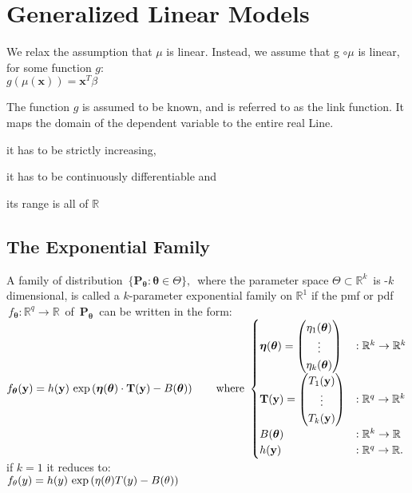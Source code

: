 
\section{Generalized Linear Models}
We relax the assumption that $\mu$ is linear. Instead, we assume that g $\circ \mu$ is linear, for some function $g$:\\

$g(\mu (\mathbf x)) = \mathbf x^ T \beta$

The function $g$ is assumed to be known, and is referred to as the link function. It maps the domain of the dependent variable to the entire real Line.

it has to be strictly increasing,

it has to be continuously differentiable and

its range is all of $\mathbb{R}$


\subsection{The Exponential Family}

A family of distribution $\, \{ \mathbf{P}_{{\boldsymbol \theta }}: {\boldsymbol \theta }\in \Theta \} ,\,$  where the parameter space $\Theta \subset \mathbb {R}^ k\,$ is -$k$ dimensional, is called a $k$-parameter exponential family on $\mathbb{R}^1$ if the pmf or pdf $\, f_{\boldsymbol \theta }:\mathbb {R}^ q\to \mathbb {R}\,$ of $\, \mathbf{P}_{{\boldsymbol \theta }}\,$ can be written in the form:\\

$\displaystyle  \displaystyle f_{\boldsymbol \theta }(\mathbf{y})=h(\mathbf{y})\, \exp \left({\boldsymbol \eta }({\boldsymbol \theta })\cdot \mathbf{T}(\mathbf{y})-B({\boldsymbol \theta })\right)\qquad \text {where } \\ \begin{cases}  {\boldsymbol \eta }({\boldsymbol \theta })=\begin{pmatrix} \eta _1({\boldsymbol \theta })\\ \vdots \\ \eta _ k({\boldsymbol \theta })\end{pmatrix}& :\mathbb {R}^ k\to \mathbb {R}^ k\\ \mathbf{T}(\mathbf{y})=\begin{pmatrix} T_1(\mathbf{y})\\ \vdots \\ T_ k(\mathbf{y})\end{pmatrix}& :\mathbb {R}^ q\to \mathbb {R}^ k\\ B({\boldsymbol \theta })& :\mathbb {R}^ k\to \mathbb {R}\\ h(\mathbf{y})& :\mathbb {R}^ q\to \mathbb {R}.\\ \end{cases}$\\


if $k=1$ it reduces to:\\

$\displaystyle  \displaystyle f_\theta (y)=h(y)\, \exp \left(\eta (\theta ) T(y)-B(\theta )\right)$

